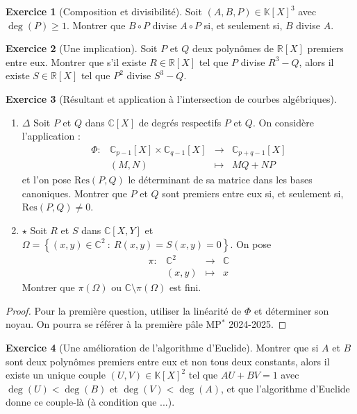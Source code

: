\documentclass[french]{book}
\newcommand{\R}{\mathbb{R}}
\newcommand{\C}{\mathbb{C}}
\newcommand{\K}{\mathbb{K}}
\newcommand{\st}{^*}
\theoremstyle{definition}
\newtheorem{ex}{Exercice}[chapter]
\theoremstyle{theorem}
\theoremstyle{remark}
\begin{document}
\begin{ex}[Composition et divisibilité]
	Soit $(A,B,P)\in\K[X]^3$ avec $\deg(P)\geqslant 1$. Montrer que $B\circ P$ divise $A\circ P$ si, et seulement si, $B$ divise $A$.
\end{ex}

\begin{ex}[Une implication]
	Soit $P$ et $Q$ deux polynômes de $\R[X]$ premiers entre eux. Montrer que s'il existe $R\in\R[X]$ tel que $P$ divise $R^3-Q$, alors il existe $S\in\R[X]$ tel que $P^2$ divise $S^3-Q$.
\end{ex}

\begin{ex}[Résultant et application à l'intersection de courbes algébriques]
	\begin{enumerate}
		\item $\Delta$ Soit $P$ et $Q$ dans $\C[X]$ de degrés respectifs $P$ et $Q$. On considère l'application : $$\begin{array}{lrcl}
			\Phi:&\C_{p-1}[X]\times\C_{q-1}[X]&\longrightarrow&\C_{p+q-1}[X]\\
			&(M,N)&\longmapsto&MQ+NP
		\end{array}$$ et l'on pose $\text{Res}(P,Q)$ le déterminant de sa matrice dans les bases canoniques. Montrer que $P$ et $Q$ sont premiers entre eux si, et seulement si, $\text{Res}(P,Q)\ne 0$.
		\item $\star$ Soit $R$ et $S$ dans $\C[X,Y]$ et $\Omega=\left\{(x,y)\in\C^2\ : \ R(x,y)=S(x,y)=0\right\}$. On pose $$\begin{array}{lrcl}
			\pi:&\C^2&\longrightarrow&\C\\
			&(x,y)&\longmapsto&x
		\end{array}$$ Montrer que $\pi(\Omega)$ ou $\C\setminus\pi(\Omega)$ est fini.
	\end{enumerate}
\end{ex}

\begin{proof}
	Pour la première question, utiliser la linéarité de $\Phi$ et déterminer son noyau. On  pourra se référer à la première pâle MP$\st$ 2024-2025.
\end{proof}

\begin{ex}[Une amélioration de l'algorithme d'Euclide]
	Montrer que si $A$ et $B$ sont deux polynômes premiers entre eux et non tous deux constants, alors il existe un unique couple $(U,V)\in\K[X]^2$ tel que $AU+BV=1$ avec $\deg(U)<\deg(B)$ et $\deg(V)<\deg(A)$, et que l'algorithme d'Euclide donne ce couple-là (à condition que ...).
\end{ex}
\end{document}
